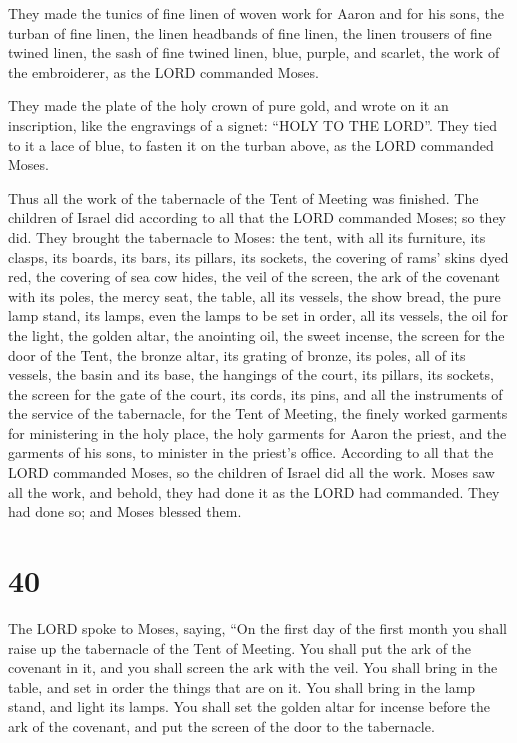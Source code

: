  They made the tunics of fine linen of woven work for
Aaron and for his sons,  the turban of fine linen, the
linen headbands of fine linen, the linen trousers of fine twined linen,
 the sash of fine twined linen, blue, purple, and
scarlet, the work of the embroiderer, as the LORD commanded Moses.

 They made the plate of the holy crown of pure gold, and
wrote on it an inscription, like the engravings of a signet: ``HOLY TO
THE LORD''.  They tied to it a lace of blue, to fasten it
on the turban above, as the LORD commanded Moses.

 Thus all the work of the tabernacle of the Tent of
Meeting was finished. The children of Israel did according to all that
the LORD commanded Moses; so they did.  They brought the
tabernacle to Moses: the tent, with all its furniture, its clasps, its
boards, its bars, its pillars, its sockets,  the covering
of rams' skins dyed red, the covering of sea cow hides, the veil of the
screen,  the ark of the covenant with its poles, the
mercy seat,  the table, all its vessels, the show bread,
 the pure lamp stand, its lamps, even the lamps to be set
in order, all its vessels, the oil for the light,  the
golden altar, the anointing oil, the sweet incense, the screen for the
door of the Tent,  the bronze altar, its grating of
bronze, its poles, all of its vessels, the basin and its base,
 the hangings of the court, its pillars, its sockets, the
screen for the gate of the court, its cords, its pins, and all the
instruments of the service of the tabernacle, for the Tent of Meeting,
 the finely worked garments for ministering in the holy
place, the holy garments for Aaron the priest, and the garments of his
sons, to minister in the priest's office.  According to
all that the LORD commanded Moses, so the children of Israel did all the
work.  Moses saw all the work, and behold, they had done
it as the LORD had commanded. They had done so; and Moses blessed them.

\hypertarget{section-39}{%
\section{40}\label{section-39}}

 The LORD spoke to Moses, saying,  ``On the
first day of the first month you shall raise up the tabernacle of the
Tent of Meeting.  You shall put the ark of the covenant in
it, and you shall screen the ark with the veil.  You shall
bring in the table, and set in order the things that are on it. You
shall bring in the lamp stand, and light its lamps.  You
shall set the golden altar for incense before the ark of the covenant,
and put the screen of the door to the tabernacle.

